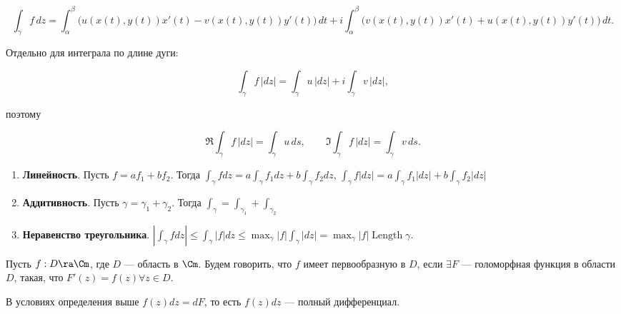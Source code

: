 \[
\int_\gamma f\,dz
=
\int_\alpha^\beta
\bigl(u(x(t),y(t))x'(t)-v(x(t),y(t))y'(t)\bigr)\,dt
+
i\int_\alpha^\beta
\bigl(v(x(t),y(t))x'(t)+u(x(t),y(t))y'(t)\bigr)\,dt.
\]

Отдельно для интеграла по длине дуги:

\[
\int_\gamma f\,|dz|
=
\int_\gamma u\,|dz|
+
i\int_\gamma v\,|dz|,
\]

поэтому

\[
\Re\int_\gamma f\,|dz|
=
\int_\gamma u\,ds,
\qquad
\Im\int_\gamma f\,|dz|
=
\int_\gamma v\,ds.
\]

\begin{note}
    \begin{enumerate}
        \item \textbf{Линейность}. Пусть \(f = a f_1 + b f_2\). Тогда \(\int_\gamma fdz = a\int_\gamma f_1dz + b\int_\gamma f_2dz\), \(\int_\gamma f|dz| = a\int_\gamma f_1|dz| + b\int_\gamma f_2|dz|\)
        
        \item \textbf{Аддитивность}. Пусть \(\gamma = \gamma_1 + \gamma_2\). Тогда \(\int_\gamma = \int_{\gamma_1} + \int_{\gamma_2}\)
        
        \item \textbf{Неравенство треугольника}. \(\left|\int_\gamma fdz\right| \le \int_\gamma |f|dz \le \max_\gamma|f|\int_\gamma |dz| = \max_\gamma |f| \operatorname{Length} \gamma\).
    \end{enumerate}
\end{note}

\begin{definition}
    Пусть \(f: D \ra \Cm\), где \(D\) --- область в \(\Cm\). Будем говорить, что \(f\) имеет первообразную в \(D\), если \(\exists F\) --- голоморфная функция в области \(D\), такая, что \(F'(z) = f(z) \forall z \in D\).
\end{definition}

\begin{note}
    В условиях определения выше \(f(z)dz = dF\), то есть \(f(z)dz\) --- полный дифференциал.
\end{note}

